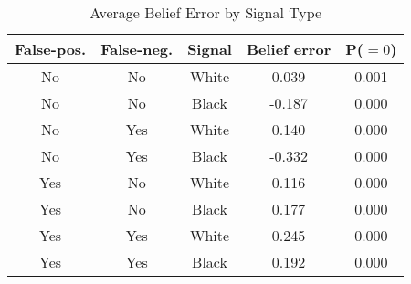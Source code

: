 \begin{table}[H]\centering \caption{Average Belief Error by Signal Type} \begin{tabular}{ccccc} \hline \hline
\textbf{False-pos.}&\textbf{False-neg.}&\textbf{Signal}&\textbf{Belief error}& \textbf{P($=0$)}\\ \hline
No&No&White&0.039&0.001\\
No&No&Black&-0.187&0.000\\
No&Yes&White&0.140&0.000\\
No&Yes&Black&-0.332&0.000\\
Yes&No&White&0.116&0.000\\
Yes&No&Black&0.177&0.000\\
Yes&Yes&White&0.245&0.000\\
Yes&Yes&Black&0.192&0.000\\
\hline \end{tabular} \end{table}
